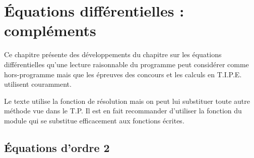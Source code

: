 \chapter{Équations différentielles : compléments}
\thispagestyle{empty}
{\sf Ce chapitre présente des développements du chapitre sur les équations différentielles qu'une lecture raisonnable du programme peut considérer comme hors-programme mais que les épreuves des concours et les calculs en T.I.P.E. utilisent couramment.

Le texte utilise la fonction  de résolution mais on peut lui substituer toute autre méthode vue dans le T.P. Il est en fait recommander d'utiliser la fonction  du module  qui se substitue efficacement aux fonctions écrites.}
\section{Équations d'ordre 2}

